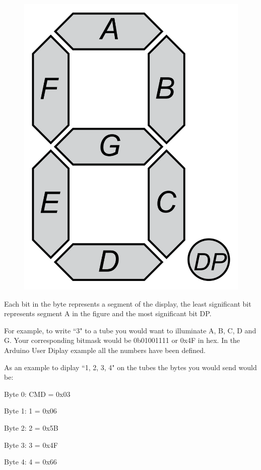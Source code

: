 \documentclass[12pt]{article}
\begin{document}
\begin{figure}[!h]
\includegraphics[scale=0.1]{7Segment}
\centering
\caption*{}
\label{fig:status}
\end{figure}

Each bit in the byte represents a segment of the display, the least significant bit represents segment A in the figure and the most significant bit DP. 

For example, to write ``3" to a tube you would want to illuminate A, B, C, D and G. Your corresponding bitmask would be 0b01001111 or 0x4F in hex. In the Arduino User Diplay example all the numbers have been defined.

As an example to diplay ``1, 2, 3, 4" on the tubes the bytes you would send would be:
\begin{description}[font=$\bullet$~\normalfont\scshape]
\item [] Byte 0: CMD = 0x03
\item [] Byte 1: 1 = 0x06
\item [] Byte 2: 2 = 0x5B
\item [] Byte 3: 3 = 0x4F
\item [] Byte 4: 4 = 0x66
\end{description}
\end{document}
